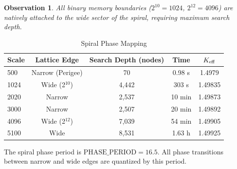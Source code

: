 \documentclass[12pt,a4paper]{article}
\newcommand{\PHASE}{\text{PHASE\_PERIOD}}
\newtheorem{observation}{Observation}[section]
\begin{document}
	\begin{observation}
		All binary memory boundaries (\(2^{10} = 1024\), \(2^{12} = 4096\)) are natively attached to the wide sector of the spiral, requiring maximum search depth.
	\end{observation}
	
	\begin{table}[H]
		\centering
		\caption{Spiral Phase Mapping}
		\label{tab:spiral}
		\begin{tabular}{l c c c c}
			\toprule
			\textbf{Scale} & \textbf{Lattice Edge} & \textbf{Search Depth (nodes)} & \textbf{Time} & \(\Keff\) \\
			\midrule
			500 & Narrow (Perigee) & 70 & 0.98 s & 1.4979 \\
			1024 & Wide (2\(^{10}\)) & 4,442 & 303 s & 1.49835 \\
			2020 & Narrow & 2,537 & 10 min & 1.49873 \\
			3000 & Narrow & 2,507 & 20 min & 1.49892 \\
			4096 & Wide (2\(^{12}\)) & 7,039 & 54 min & 1.49905 \\
			5100 & Wide & 8,531 & 1.63 h & 1.49925 \\
			\bottomrule
		\end{tabular}
	\end{table}
	
	\begin{verifiedbox}
		The spiral phase period is \(\PHASE = 16.5\). All phase transitions between narrow and wide edges are quantized by this period.
	\end{verifiedbox}
\end{document}
